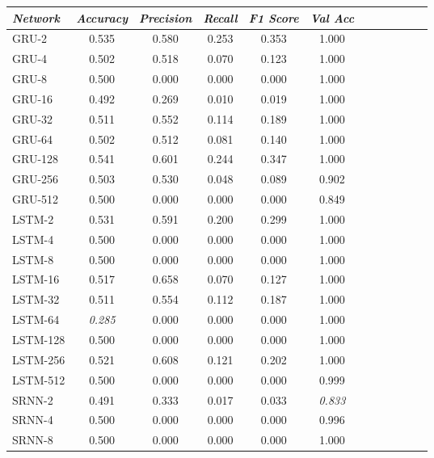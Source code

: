 \begin{table}
\begin{tabularx}{\textwidth}{@{}l*{10}{C}c@{}}
\toprule
  \textit{Network} &  \textit{Accuracy} &  \textit{Precision} &  \textit{Recall} &  \textit{F1 Score} &  \textit{Val Acc} \\
\midrule
    GRU-2 &     0.535 &      0.580 &   0.253 &     0.353 &    1.000 \\
    GRU-4 &     0.502 &      0.518 &   0.070 &     0.123 &    1.000 \\
    GRU-8 &     0.500 &      0.000 &   0.000 &     0.000 &    1.000 \\
   GRU-16 &     0.492 &      0.269 &   0.010 &     0.019 &    1.000 \\
   GRU-32 &     0.511 &      0.552 &   0.114 &     0.189 &    1.000 \\
   GRU-64 &     0.502 &      0.512 &   0.081 &     0.140 &    1.000 \\
  GRU-128 &     0.541 &      0.601 &   0.244 &     0.347 &    1.000 \\
  GRU-256 &     0.503 &      0.530 &   0.048 &     0.089 &    0.902 \\
  GRU-512 &     0.500 &      0.000 &   0.000 &     0.000 &    0.849 \\
   LSTM-2 &     0.531 &      0.591 &   0.200 &     0.299 &    1.000 \\
   LSTM-4 &     0.500 &      0.000 &   0.000 &     0.000 &    1.000 \\
   LSTM-8 &     0.500 &      0.000 &   0.000 &     0.000 &    1.000 \\
  LSTM-16 &     0.517 &      0.658 &   0.070 &     0.127 &    1.000 \\
  LSTM-32 &     0.511 &      0.554 &   0.112 &     0.187 &    1.000 \\
  LSTM-64 &     \textit{0.285} &      0.000 &   0.000 &     0.000 &    1.000 \\
 LSTM-128 &     0.500 &      0.000 &   0.000 &     0.000 &    1.000 \\
 LSTM-256 &     0.521 &      0.608 &   0.121 &     0.202 &    1.000 \\
 LSTM-512 &     0.500 &      0.000 &   0.000 &     0.000 &    0.999 \\
   SRNN-2 &     0.491 &      0.333 &   0.017 &     0.033 &    \textit{0.833} \\
   SRNN-4 &     0.500 &      0.000 &   0.000 &     0.000 &    0.996 \\
   SRNN-8 &     0.500 &      0.000 &   0.000 &     0.000 &    1.000 \\

\end{tabularx}
\end{table}
